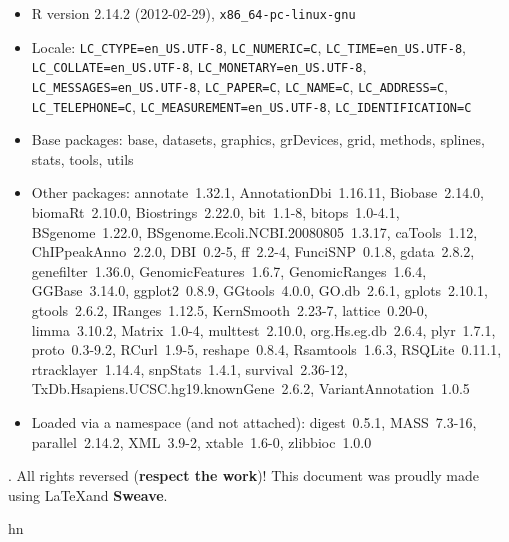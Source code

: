 \documentclass[12pt,fullpage]{article}
\begin{document}
\begin{itemize}\raggedright
  \item R version 2.14.2 (2012-02-29), \verb|x86_64-pc-linux-gnu|
  \item Locale: \verb|LC_CTYPE=en_US.UTF-8|, \verb|LC_NUMERIC=C|, \verb|LC_TIME=en_US.UTF-8|, \verb|LC_COLLATE=en_US.UTF-8|, \verb|LC_MONETARY=en_US.UTF-8|, \verb|LC_MESSAGES=en_US.UTF-8|, \verb|LC_PAPER=C|, \verb|LC_NAME=C|, \verb|LC_ADDRESS=C|, \verb|LC_TELEPHONE=C|, \verb|LC_MEASUREMENT=en_US.UTF-8|, \verb|LC_IDENTIFICATION=C|
  \item Base packages: base, datasets, graphics, grDevices, grid,
    methods, splines, stats, tools, utils
  \item Other packages: annotate~1.32.1, AnnotationDbi~1.16.11,
    Biobase~2.14.0, biomaRt~2.10.0, Biostrings~2.22.0, bit~1.1-8,
    bitops~1.0-4.1, BSgenome~1.22.0,
    BSgenome.Ecoli.NCBI.20080805~1.3.17, caTools~1.12,
    ChIPpeakAnno~2.2.0, DBI~0.2-5, ff~2.2-4, FunciSNP~0.1.8,
    gdata~2.8.2, genefilter~1.36.0, GenomicFeatures~1.6.7,
    GenomicRanges~1.6.4, GGBase~3.14.0, ggplot2~0.8.9, GGtools~4.0.0,
    GO.db~2.6.1, gplots~2.10.1, gtools~2.6.2, IRanges~1.12.5,
    KernSmooth~2.23-7, lattice~0.20-0, limma~3.10.2,
    Matrix~1.0-4, multtest~2.10.0, org.Hs.eg.db~2.6.4, plyr~1.7.1,
    proto~0.3-9.2, RCurl~1.9-5, reshape~0.8.4, Rsamtools~1.6.3,
    RSQLite~0.11.1, rtracklayer~1.14.4, snpStats~1.4.1,
    survival~2.36-12, TxDb.Hsapiens.UCSC.hg19.knownGene~2.6.2,
    VariantAnnotation~1.0.5
  \item Loaded via a namespace (and not attached): digest~0.5.1,
    MASS~7.3-16, parallel~2.14.2, XML~3.9-2, xtable~1.6-0,
    zlibbioc~1.0.0
\end{itemize}
. All rights reversed (\textbf{respect the work})! This
document was proudly made using \LaTeX and \textbf{Sweave}.

hn
\end{document}
